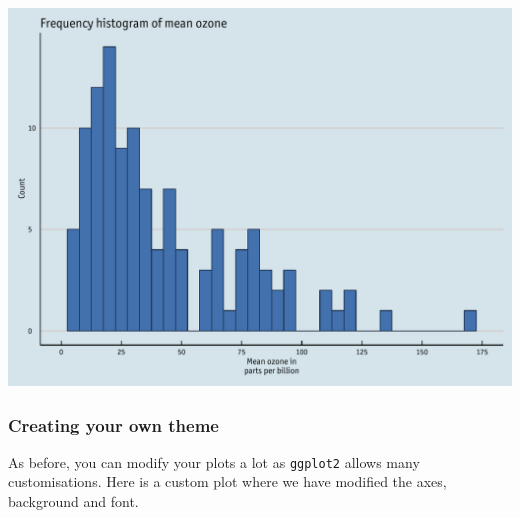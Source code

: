 \documentclass[]{article}
\begin{document}
\begin{center}\includegraphics{0_all_posts_pdf/histogram_15-1} \end{center}

\subsubsection{Creating your own theme}\label{creating-your-own-theme-6}

As before, you can modify your plots a lot as \texttt{ggplot2} allows
many customisations. Here is a custom plot where we have modified the
axes, background and font.
\end{document}
